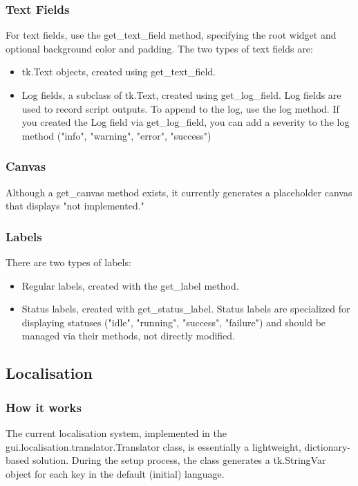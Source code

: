 \documentclass{article}
\begin{document}
\subsubsection{Text Fields} %
For text fields, use the get\_text\_field method, specifying the root widget and optional background color and padding. The two types of text fields are:
\begin{itemize}
    \item tk.Text objects, created using get\_text\_field.
    \item Log fields, a subclass of tk.Text, created using get\_log\_field. Log fields are used to record script outputs. To append to the log, use the log method. If you created the Log field via get\_log\_field, you can add a severity to the log method ("info", "warning", "error", "success")
\end{itemize}

\subsubsection{Canvas}
Although a get\_canvas method exists, it currently generates a placeholder canvas that displays "not implemented."

\subsubsection{Labels}
There are two types of labels:
\begin{itemize}
    \item Regular labels, created with the get\_label method.
    \item Status labels, created with get\_status\_label. Status labels are specialized for displaying statuses ("idle", "running", "success", "failure") and should be managed via their methods, not directly modified.
\end{itemize}

\subsection{Localisation}
\label{ter:localisation}
\subsubsection{How it works}
The current localisation system, implemented in the gui.localisation.translator.Translator class, is essentially a lightweight, dictionary-based solution. During the setup process, the class generates a tk.StringVar object for each key in the default (initial) language.
\end{document}
